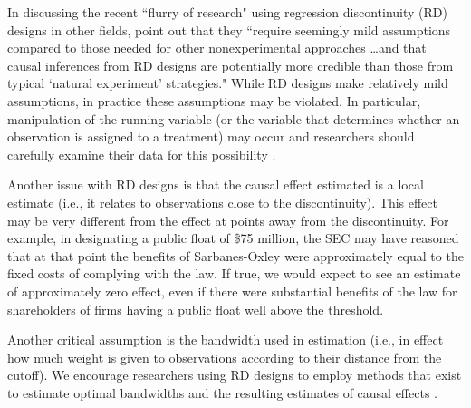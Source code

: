 \documentclass[12pt,reqno,titlepage]{amsart}
\theoremstyle{definition}
\begin{document}
\begin{doublespace}
In discussing the recent ``flurry of research" using regression discontinuity (RD) designs in other fields, \citet[p.\,282]{Lee:2010hy} point out that they ``require seemingly mild assumptions compared to those needed for other nonexperimental approaches \dots and that causal inferences from RD designs are potentially more credible than those from typical `natural experiment' strategies."
While RD designs make relatively mild assumptions, in practice these assumptions may be violated.
In particular, manipulation of the running variable (or the variable that determines whether an observation is assigned to a treatment) may occur and researchers should carefully examine their data for this possibility \citep[see, e.g.,][]{Listokin:2008p5958,McCrary:2008ft}.

Another issue with RD designs is that the causal effect estimated is a local estimate (i.e., it relates to observations close to the discontinuity).
This effect may be very different from the effect at points away from the discontinuity.
For example, in designating a public float of \$75 million, the SEC may have reasoned that at that point the benefits of Sarbanes-Oxley were approximately equal to the fixed costs of complying with the law.
If true, we would expect to see an estimate of approximately zero effect, even if there were substantial benefits of the law for shareholders of firms having a public float well above the threshold.

Another critical assumption is the bandwidth used in estimation (i.e., in effect how much weight is given to observations according to their distance from the cutoff).
We encourage researchers using RD designs to employ methods that exist to estimate optimal bandwidths and the resulting estimates of causal effects \citep[e.g.,][]{Imbens:2011}.


\end{doublespace}
\end{document}
